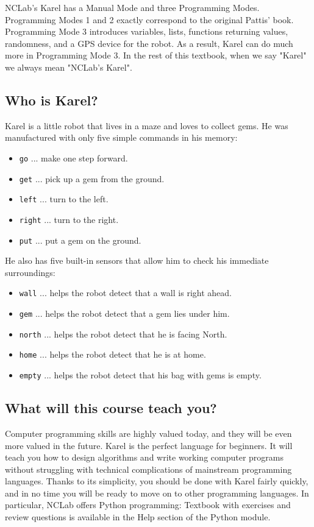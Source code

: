 NCLab's Karel has a Manual Mode and three Programming Modes. Programming 
Modes 1 and 2 exactly correspond to the original Pattis' book. Programming Mode 3 
introduces variables, lists, functions returning values, randomness, 
and a GPS device for the robot. As a result, Karel can do much more in Programming 
Mode 3. In the rest of this textbook, when we say "Karel" we always mean "NCLab's Karel".

\subsection{Who is Karel?}

Karel is a little robot that lives in a maze and loves to collect gems.
He was manufactured with only five simple commands in his memory:

\begin{itemize}
\item {\color{blue} \tt go} ... make one step forward.
\item {\color{blue} \tt get} ... pick up a gem from the ground. 
\item {\color{blue} \tt left} ... turn to the left.
\item {\color{blue} \tt right} ... turn to the right. 
\item {\color{blue} \tt put} ... put a gem on the ground. 
\end{itemize}
He also has five built-in sensors that allow him to check his immediate surroundings:
\begin{itemize}
\item {\color{ForestGreen} \tt wall} ... helps the robot detect that a wall is right ahead.
\item {\color{ForestGreen} \tt gem} ... helps the robot detect that a gem lies under him.
\item {\color{ForestGreen} \tt north} ... helps the robot detect that he is facing North.
\item {\color{ForestGreen} \tt home} ... helps the robot detect that he is at home.
\item {\color{ForestGreen} \tt empty} ... helps the robot detect that his bag with gems is empty.
\end{itemize}

\subsection{What will this course teach you?}

Computer programming skills are highly valued today, and they will be even more 
valued in the future. Karel is the perfect language for beginners. It will teach
you how to design algorithms and write working computer programs without struggling 
with technical complications of mainstream programming languages. Thanks to its 
simplicity, you should be done with Karel fairly quickly, and in no time you will be 
ready to move on to other programming languages. In particular, NCLab offers
Python programming: Textbook with exercises and review questions is available in
the Help section of the Python module.  

